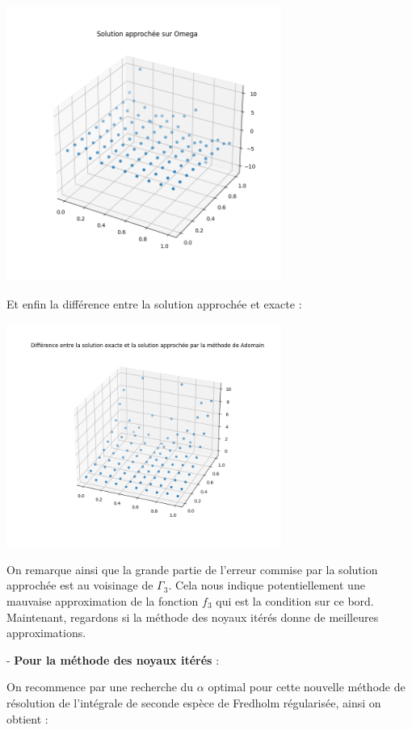 \documentclass{article}
\begin{document}
    {
    \includegraphics[width=9cm]{calc_adomain.png} \par}
    \bigskip

    Et enfin la différence entre la solution approchée et exacte :

    {
    \includegraphics[width=9cm]{Diff_adomain.png}\par}
    \bigskip

    On remarque ainsi que la grande partie de l'erreur commise par la solution approchée est au voisinage de $\Gamma_3$. Cela nous indique potentiellement une mauvaise approximation de la fonction $f_3$ qui est la condition sur ce bord. Maintenant, regardons si la méthode des noyaux itérés donne de meilleures approximations.
    
    
    \bigskip
    
    
    - \textbf{Pour la méthode des noyaux itérés} :

    
    On recommence par une recherche du $\alpha$ optimal pour cette nouvelle méthode de résolution de l'intégrale de seconde espèce de Fredholm régularisée, ainsi on obtient :
\end{document}
